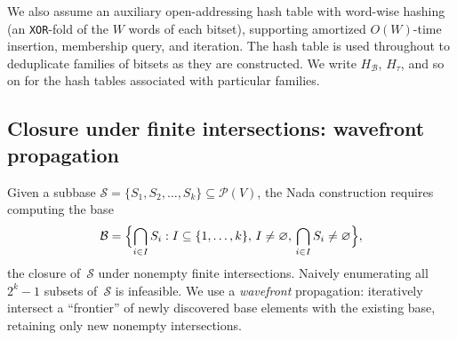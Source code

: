 \documentclass[11pt,a4paper]{article}
\theoremstyle{plain}
\theoremstyle{definition}
\newcommand{\powerset}{\mathcal{P}}
\newcommand{\subbase}{\mathcal{S}}
\newcommand{\base}{\mathcal{B}}
\begin{document}
We also assume an auxiliary open-addressing hash table with word-wise hashing
(an \texttt{XOR}-fold of the $W$ words of each bitset), supporting amortized
$O(W)$-time insertion, membership query, and iteration.  The hash table is
used throughout to deduplicate families of bitsets as they are constructed.
We write $H_{\base}$, $H_{\tau}$, and so on for the hash tables associated
with particular families.


\subsection{Closure under finite intersections: wavefront propagation}%
\label{subsec:intersection-closure}

Given a subbase $\subbase = \{S_1, S_2, \ldots, S_k\} \subseteq \powerset(V)$,
the Nada construction requires computing the base
\[
  \base = \Bigl\{\bigcap_{i \in I} S_i : I \subseteq \{1, \ldots, k\},\,
  I \neq \varnothing,\, \bigcap_{i \in I} S_i \neq \varnothing\Bigr\},
\]
the closure of~$\subbase$ under nonempty finite intersections.  Naively
enumerating all $2^k - 1$ subsets of~$\subbase$ is infeasible.  We use a
\emph{wavefront} propagation: iteratively intersect a ``frontier'' of newly
discovered base elements with the existing base, retaining only new nonempty
intersections.
\end{document}
